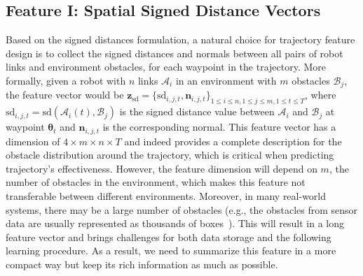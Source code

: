 \documentclass[letterpaper, 10 pt, conference]{ieeeconf}  %
\newcommand{\btheta}{\mbox{$\bm \theta$}}
\newcommand{\fsd}{\mbox{$\mathbf z_{\text{sd}}$}}
\begin{document}
\subsection{Feature I: Spatial Signed Distance Vectors}
Based on the signed distances formulation, a natural choice for trajectory feature design is to collect the signed distances and normals between all pairs of robot links and environment obstacles, for each waypoint in the trajectory. More formally, given a robot with $n$ links $\mathcal A_i$ in an environment with $m$ obstacles $\mathcal B_j$, the feature vector would be $\fsd = \{\text{sd}_{i,j,t}, \mathbf n_{i,j,t}\}_{1\leq i \leq n, 1\leq j \leq m, 1\leq t \leq T}$, where $\text{sd}_{i,j,t} = \text{sd}(\mathcal A_i(t), \mathcal B_j)$ is the signed distance value between $\mathcal A_i$ and $\mathcal B_j$ at waypoint $\btheta_t$ and $\mathbf n_{i,j,t}$ is the corresponding normal. This feature vector has a dimension of $4\times m \times n \times T$ and indeed provides a complete description for the obstacle distribution around the trajectory, which is critical when predicting trajectory's effectiveness. However, the feature dimension will depend on $m$, the number of obstacles in the environment, which makes this feature not transferable between different environments. Moreover, in many real-world systems, there may be a large number of obstacles (e.g., the obstacles from sensor data are usually represented as thousands of boxes~\cite{Sucan:2010:CPT}). This will result in a long feature vector and brings challenges for both data storage and the following learning procedure. As a result, we need to summarize this feature in a more compact way but keep its rich information as much as possible. 
\end{document}
